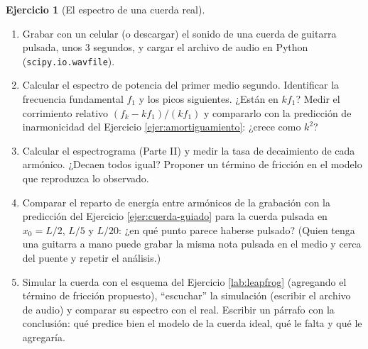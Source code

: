 \documentclass[12pt, a4paper]{amsbook}
\theoremstyle{remark}
\theoremstyle{definition}
\newtheorem{ejer}[teo]{Ejercicio}
\numberwithin{section}{chapter}
\numberwithin{subsection}{section}
\numberwithin{equation}{section}
\numberwithin{figure}{chapter}
\begin{document}
\begin{ejer}[El espectro de una cuerda real]\label{lab:cuerda}
\begin{enumerate}
\item Grabar con un celular (o descargar) el sonido de una cuerda de guitarra pulsada, unos $3$ segundos, y cargar el archivo de audio en Python (\lstinline{scipy.io.wavfile}).
\item Calcular el espectro de potencia del primer medio segundo. Identificar la frecuencia fundamental $f_1$ y los picos siguientes. ¿Están en $kf_1$? Medir el corrimiento relativo $(f_k - kf_1)/(kf_1)$ y compararlo con la predicción de inarmonicidad del Ejercicio \ref{ejer:amortiguamiento}: ¿crece como $k^2$?
\item Calcular el espectrograma (Parte II) y medir la tasa de decaimiento de cada armónico. ¿Decaen todos igual? Proponer un término de fricción en el modelo que reproduzca lo observado.
\item Comparar el reparto de energía entre armónicos de la grabación con la predicción del Ejercicio \ref{ejer:cuerda-guiado} para la cuerda pulsada en $x_0 = L/2$, $L/5$ y $L/20$: ¿en qué punto parece haberse pulsado? (Quien tenga una guitarra a mano puede grabar la misma nota pulsada en el medio y cerca del puente y repetir el análisis.)
\item Simular la cuerda con el esquema del Ejercicio \ref{lab:leapfrog} (agregando el término de fricción propuesto), ``escuchar'' la simulación (escribir el archivo de audio) y comparar su espectro con el real. Escribir un párrafo con la conclusión: qué predice bien el modelo de la cuerda ideal, qué le falta y qué le agregaría.
\end{enumerate}
\end{ejer}
\end{document}

